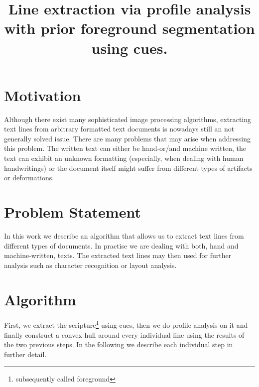 \documentclass[conference]{IEEEtran}
\begin{document}
%
\title{Line extraction via profile analysis 
with prior foreground segmentation using cues.}

\author{
\and
{}
}

\maketitle

\section{Motivation}
Although there exist many sophisticated image processing algorithms, 
extracting text lines from arbitrary formatted text documents is nowadays still an not generally solved issue. 
There are many problems that may arise when addressing this problem. 
The written text can either be hand-or/and machine written, 
the text can exhibit an unknown formatting 
(especially, when dealing with human handwritings) 
or the document itself might suffer from different types of artifacts or deformations. 

\section{Problem Statement}
In this work we describe an algorithm that allows us to extract text lines from different types of documents. 
In practise we are dealing with both, 
hand and machine-written, texts. 
The extracted text lines may then used for further analysis such as character recognition or layout analysis.

\section{Algorithm}
First, we extract the scripture\footnote{subsequently called foreground} 
using cues, then we do profile analysis on it and finally construct a 
convex hull around every individual line using the results of the two previous steps. 
In the following we describe each individual step in further detail.
\end{document}

